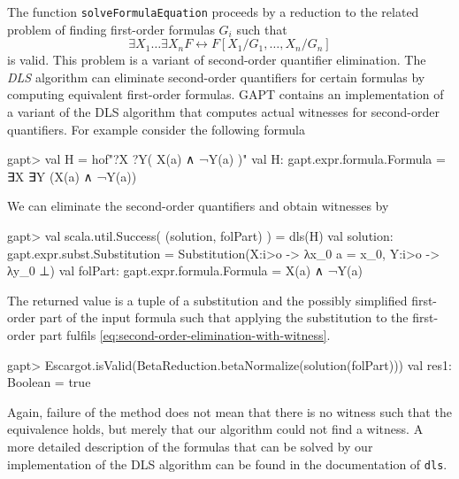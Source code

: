 \documentclass[a4paper,11pt]{book}
\begin{document}
The function \texttt{solveFormulaEquation} proceeds by a reduction to the related problem of finding first-order formulas $G_{i}$ such that 
\begin{equation}
  \label{eq:second-order-elimination-with-witness}
  \exists X_1 \dots \exists X_n F \leftrightarrow F[X_1/G_1,\dots,X_n/G_n]
\end{equation}
is valid.
This problem is a variant of second-order quantifier elimination.
The \emph{DLS} algorithm \cite{Doherty1997Computing} can eliminate second-order quantifiers for certain formulas by computing equivalent first-order formulas.
GAPT contains an implementation of a variant of the DLS algorithm that computes actual witnesses for second-order quantifiers.
For example consider the following formula
\begin{clilisting}
gapt> val H = hof"?X ?Y( X(a) ∧ ¬Y(a) )"
val H: gapt.expr.formula.Formula = ∃X ∃Y (X(a) ∧ ¬Y(a))

\end{clilisting}
We can eliminate the second-order quantifiers and obtain witnesses by
\begin{clilisting}
gapt> val scala.util.Success( (solution, folPart) ) = dls(H)
val solution: gapt.expr.subst.Substitution = Substitution(X:i>o -> λx_0 a = x_0, Y:i>o -> λy_0 ⊥)
val folPart: gapt.expr.formula.Formula = X(a) ∧ ¬Y(a)

\end{clilisting}
The returned value is a tuple of a substitution and the possibly simplified first-order part of the input formula such that applying the substitution to the first-order part fulfils \eqref{eq:second-order-elimination-with-witness}.
\begin{clilisting}
gapt> Escargot.isValid(BetaReduction.betaNormalize(solution(folPart)))
val res1: Boolean = true

\end{clilisting}
Again, failure of the method does not mean that there is no witness such that the equivalence holds, but merely that our algorithm could not find a witness.
A more detailed description of the formulas that can be solved by our implementation of the DLS algorithm can be found in the documentation of \texttt{dls}.
\vfill
\pagebreak
\end{document}
